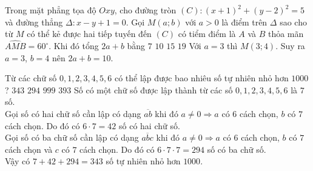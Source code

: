 \begin{ex}%
Trong mặt phẳng tọa độ $Oxy$, cho đường tròn $\left(C\right)\colon \left(x+1\right)^2+  \left(y-2\right)^2 = 5$ và đường thẳng $\Delta\colon x-y+1=0$. Gọi $M\left(a;b\right)$ với $a>0$ là điểm trên $\Delta$ sao cho từ $M$ có thể kẻ được hai tiếp tuyến đến $\left(C\right)$ có tiểm điểm là $A$ và $B$ thỏa mãn $\widehat{AMB} = 60^\circ$. Khi đó tổng $2a + b$ bằng
\choice
{$7$}
{\True $10$}
{$15$}
{$19$}
\loigiai
{
\noindent Với $a=  3$ thì $M(3;4)$. Suy ra $a = 3$, $b = 4$ nên $2a + b = 10$.
}
\end{ex}

\begin{ex}%
Từ các chữ số $0,1,2,3,4,5,6$ có thể lập được bao nhiêu số tự nhiên nhỏ hơn $1000$?
\choice
{\True $343$}
{$294$}
{$999$}
{$393$}
\loigiai
{Số có một chữ số được lập thành từ các số $0,1,2,3,4,5,6$ là $7$ số.\\
Gọi số có hai chữ số cần lập có dạng $\overline{ab}$ khi đó $a\ne0\Rightarrow a$ có $6$ cách chọn, $b$ có $7$ cách chọn. Do đó có $6\cdot 7=42$ số có hai chữ số.\\
Gọi số có ba chữ số cần lập có dạng $\overline{abc}$ khi đó $a\ne0\Rightarrow a$ có $6$ cách chọn, $b$ có $7$ cách chọn và $c$ có $7$ cách chọn. Do đó có $6\cdot 7 \cdot 7 = 294$ số có ba chữ số.\\ Vậy có $7+42+294=343$ số tự nhiên nhỏ hơn $1000$.
}
\end{ex}

